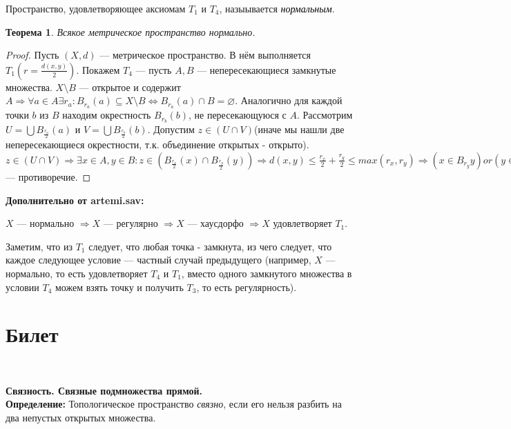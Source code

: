 \documentclass[a4paper,100pt]{article}
\theoremstyle{indented}
\newtheorem{theorem}{Теорема}
\begin{document}
    Пространство, удовлетворяющее аксиомам $T_1$ и $T_4$, назыывается \textit{\textcolor{black}{нормальным}}.\\
    
    \begin{theorem}
        Всякое метрическое пространство нормально.
    \end{theorem}
    
    \begin{proof}
        Пусть $(X,d)$ --- метрическое пространство. В нём выполняется $T_1(r = \frac{d(x,y)}{2})$. Покажем $T_4$ --- пусть $A,B$ --- непересекающиеся замкнутые множества. $X \setminus B$ --- открытое и содержит $A \Rightarrow \forall a \in A \exists r_a: B_{r_a}(a) \subseteq X \setminus B \iff B_{r_a}(a) \cap B = \varnothing$. Аналогично для каждой точки $b$ из $B$ находим окрестность $B_{r_b}(b)$, не пересекающуюся с $A$. Рассмотрим $U = \bigcup B_{\frac{r_a}{2}}(a)$  и $V = \bigcup B_{\frac{r_b}2}(b)$. Допустим $z \in (U \cap V)$(иначе мы нашли две непересекающиеся окрестности, т.к. объединение открытых - открыто). $z \in (U \cap V) \Rightarrow \exists x \in A, y \in B: z \in (B_{\frac{r_x}2}(x) \cap B_{\frac{r_y}2}(y)) \Rightarrow d(x,y) \leq \frac{r_x}2 + \frac{r_y}2 \leq max(r_x,r_y) \Rightarrow (x\in B_{r_y}y) or (y \in B_{r_x}(x))$--- противоречие. 
    \end{proof}
    
    \textbf{Дополнительно от artemi.sav:}
    
    $X$ --- нормально $\Rightarrow X$ --- регулярно $\Rightarrow X$ --- хаусдорфо $\Rightarrow X$ удовлетворяет $T_1$.
    
    Заметим, что из $T_1$ следует, что любая точка - замкнута, из чего следует, что каждое следующее условие ---  частный случай предыдущего (например, $X$ --- нормально, то есть удовлетворяет $T_4$ и $T_1$, вместо одного замкнутого множества в условии $T_4$ можем взять точку и получить $T_3$, то есть регулярность).


\section{Билет} \

\medskip

\textbf{Связность. Связные подмножества прямой.}\\

\textbf{Определение:} Топологическое пространство \textit{связно}, если его нельзя разбить на два непустых открытых множества.
\\
\end{document}
